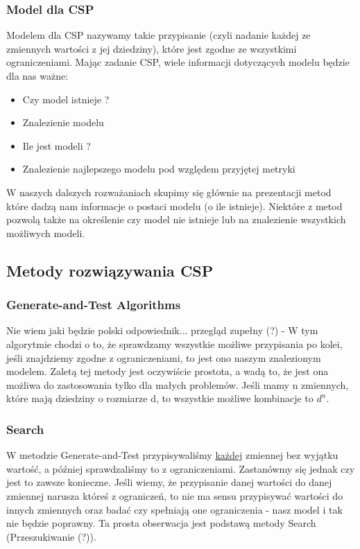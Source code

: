 \documentclass[a4paper,15pt]{article}
\begin{document}
\subsubsection{Model dla CSP}
Modelem dla CSP nazywamy takie przypisanie (czyli nadanie każdej ze zmiennych wartości z jej dziedziny), które jest zgodne ze wszystkimi ograniczeniami. Mając zadanie CSP, wiele informacji dotyczących modelu będzie dla nas ważne:
\begin{itemize}
\item Czy model istnieje ?
\item Znalezienie modelu
\item Ile jest modeli ?
\item Znalezienie najlepszego modelu pod względem przyjętej metryki
\end{itemize}

W naszych dalszych rozważaniach skupimy się głównie na prezentacji metod które dadzą nam informacje o postaci modelu (o ile istnieje). Niektóre z metod pozwolą także na określenie czy model nie istnieje lub na znalezienie wszystkich możliwych modeli. 

\subsection{Metody rozwiązywania CSP}

\subsubsection{Generate-and-Test Algorithms}
Nie wiem jaki będzie polski odpowiednik... przegląd zupełny (?) - W tym algorytmie chodzi o to, że sprawdzamy wszystkie możliwe przypisania po kolei, jeśli znajdziemy zgodne z ograniczeniami, to jest ono naszym znalezionym modelem. Zaletą tej metody jest oczywiście prostota, a wadą to, że jest ona możliwa do zastosowania tylko dla małych problemów. Jeśli mamy n zmiennych, które mają dziedziny o rozmiarze d, to wszystkie możliwe kombinacje to $d^n$. 

\subsubsection{Search}
W metodzie Generate-and-Test przypisywaliśmy \underline{każdej} zmiennej bez wyjątku wartość, a później sprawdzaliśmy to z ograniczeniami. Zastanówmy się jednak czy jest to zawsze konieczne. Jeśli wiemy, że przypisanie danej wartości do danej zmiennej narusza któreś z ograniczeń, to nie ma sensu przypisywać wartości do innych zmiennych oraz badać czy spełniają one ograniczenia - nasz model i tak nie będzie poprawny. Ta prosta obserwacja jest podstawą metody Search (Przeszukiwanie (?)). \\
\end{document}
